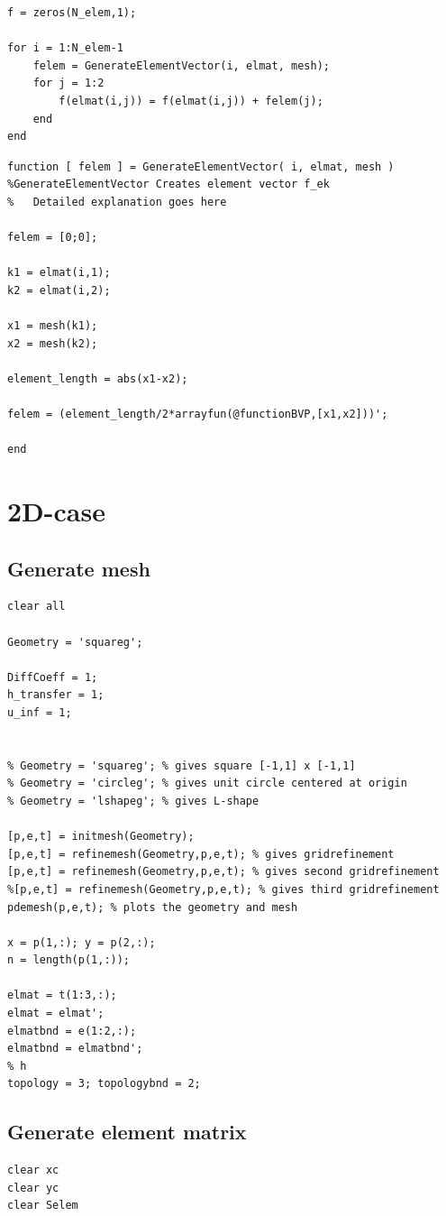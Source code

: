 \documentclass[a4paper]{report}
\begin{document}
\begin{appendices}
\begin{lstlisting}
f = zeros(N_elem,1);

for i = 1:N_elem-1
	felem = GenerateElementVector(i, elmat, mesh);
	for j = 1:2
		f(elmat(i,j)) = f(elmat(i,j)) + felem(j);
	end
end
\end{lstlisting}

\begin{lstlisting}
function [ felem ] = GenerateElementVector( i, elmat, mesh )
%GenerateElementVector Creates element vector f_ek
%   Detailed explanation goes here

felem = [0;0];

k1 = elmat(i,1);
k2 = elmat(i,2);

x1 = mesh(k1);
x2 = mesh(k2);

element_length = abs(x1-x2);

felem = (element_length/2*arrayfun(@functionBVP,[x1,x2]))';

end
\end{lstlisting}

\chapter{2D-case}


\section{Generate mesh}
\begin{lstlisting}
clear all

Geometry = 'squareg'; 

DiffCoeff = 1;
h_transfer = 1;
u_inf = 1;


% Geometry = 'squareg'; % gives square [-1,1] x [-1,1]
% Geometry = 'circleg'; % gives unit circle centered at origin
% Geometry = 'lshapeg'; % gives L-shape

[p,e,t] = initmesh(Geometry);
[p,e,t] = refinemesh(Geometry,p,e,t); % gives gridrefinement
[p,e,t] = refinemesh(Geometry,p,e,t); % gives second gridrefinement
%[p,e,t] = refinemesh(Geometry,p,e,t); % gives third gridrefinement
pdemesh(p,e,t); % plots the geometry and mesh

x = p(1,:); y = p(2,:);
n = length(p(1,:));

elmat = t(1:3,:);
elmat = elmat';
elmatbnd = e(1:2,:);
elmatbnd = elmatbnd';
% h
topology = 3; topologybnd = 2;
\end{lstlisting}


\newpage

\section{Generate element matrix}
\begin{lstlisting}
clear xc
clear yc
clear Selem


\end{lstlisting}
\end{appendices}
\end{document}
